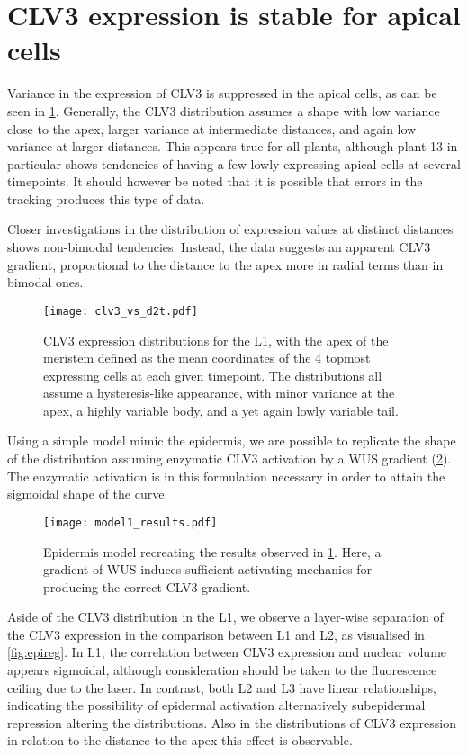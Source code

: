 \section{CLV3 expression is stable for apical cells}
Variance in the expression of CLV3 is suppressed in the apical cells, as can be
seen in \cref{fig:clv3d2t}. Generally, the CLV3 distribution assumes a
shape with low variance close to the apex, larger variance at intermediate
distances, and again low variance at larger distances. 
This appears true for all plants, although plant
13 in particular shows tendencies of having a few lowly expressing apical cells at
several timepoints. It should however be noted that it is possible that errors
in the tracking produces this type of data. 

Closer investigations in the distribution of expression
values at distinct distances shows non-bimodal tendencies. Instead, the data
suggests an apparent CLV3 gradient, proportional to the distance to the apex
more in radial terms than in bimodal ones.

\begin{figure}[H]
  \centering
  \texttt{[image: clv3\_vs\_d2t.pdf]}
  \caption[CLV3 distributions]{CLV3 expression distributions for the L1, with the apex of the
    meristem defined as the mean coordinates of the 4 topmost expressing cells
    at each given timepoint. The distributions all assume a hysteresis-like
    appearance, with minor variance at the apex, a highly variable body, and a
    yet again lowly variable tail.}
  \label{fig:clv3d2t}
\end{figure}

Using a simple model mimic the epidermis, we are possible to
replicate the shape of the distribution assuming enzymatic CLV3 activation by a WUS gradient
(\cref{fig:model1}). The enzymatic activation is in this formulation necessary in order to
attain the sigmoidal shape of the curve.

\begin{figure}[H]
  \centering
  \texttt{[image: model1\_results.pdf]}
  \caption[Epidermis model]{Epidermis model recreating the results observed in
    \cref{fig:clv3d2t}. Here, a gradient of WUS induces sufficient
    activating mechanics for producing the correct CLV3 gradient.}
  \label{fig:model1}
\end{figure}

Aside of the CLV3 distribution in the L1, we observe a layer-wise separation of
the CLV3 expression in the comparison between
L1 and L2, as visualised in \cref{fig:epireg}. In L1, the correlation between
CLV3 expression and nuclear volume appears sigmoidal, although consideration
should be taken to the fluorescence ceiling due to the laser. In contrast, both
L2 and L3 have linear relationships, indicating the possibility of epidermal
activation alternatively subepidermal repression altering the distributions.
Also in the distributions of CLV3 expression in relation to the distance to the
apex this effect is observable.

